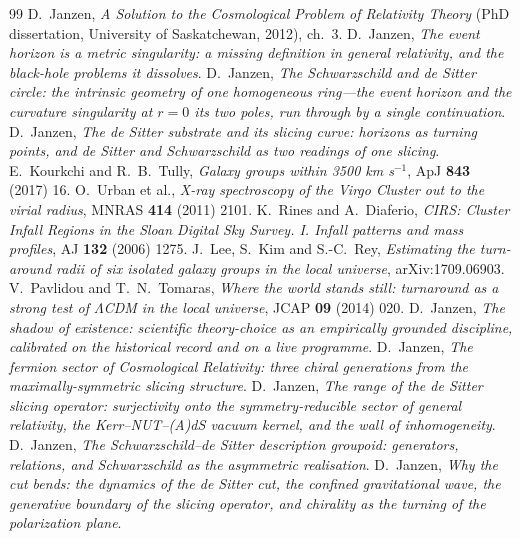 \documentclass[11pt,a4paper]{article}
\theoremstyle{plain}
\theoremstyle{definition}
\begin{document}
\begin{thebibliography}{99}
 D.~Janzen, \emph{A Solution to the Cosmological Problem of Relativity Theory} (PhD dissertation, University of Saskatchewan, 2012), ch.~3.
 D.~Janzen, \emph{The event horizon is a metric singularity: a missing definition in general relativity, and the black-hole problems it dissolves}.
 D.~Janzen, \emph{The Schwarzschild and de Sitter circle: the intrinsic geometry of one homogeneous ring---the event horizon and the curvature singularity at $r=0$ its two poles, run through by a single continuation}.
 D.~Janzen, \emph{The de Sitter substrate and its slicing curve: horizons as turning points, and de Sitter and Schwarzschild as two readings of one slicing}.
 E.~Kourkchi and R.~B.~Tully, \emph{Galaxy groups within 3500 km s$^{-1}$}, ApJ \textbf{843} (2017) 16.
 O.~Urban et al., \emph{X-ray spectroscopy of the Virgo Cluster out to the virial radius}, MNRAS \textbf{414} (2011) 2101.
 K.~Rines and A.~Diaferio, \emph{CIRS: Cluster Infall Regions in the Sloan Digital Sky Survey. I. Infall patterns and mass profiles}, AJ \textbf{132} (2006) 1275.
 J.~Lee, S.~Kim and S.-C.~Rey, \emph{Estimating the turn-around radii of six isolated galaxy groups in the local universe}, arXiv:1709.06903.
 V.~Pavlidou and T.~N.~Tomaras, \emph{Where the world stands still: turnaround as a strong test of $\Lambda$CDM in the local universe}, JCAP \textbf{09} (2014) 020.
 D.~Janzen, \emph{The shadow of existence: scientific theory-choice as an empirically grounded discipline, calibrated on the historical record and on a live programme}.
 D.~Janzen, \emph{The fermion sector of Cosmological Relativity: three chiral generations from the maximally-symmetric slicing structure}.
 D.~Janzen, \emph{The range of the de Sitter slicing operator: surjectivity onto the symmetry-reducible sector of general relativity, the Kerr--NUT--(A)dS vacuum kernel, and the wall of inhomogeneity}.
 D.~Janzen, \emph{The Schwarzschild--de Sitter description groupoid: generators, relations, and Schwarzschild as the asymmetric realisation}.
 D.~Janzen, \emph{Why the cut bends: the dynamics of the de Sitter cut, the confined gravitational wave, the generative boundary of the slicing operator, and chirality as the turning of the polarization plane}.

\end{thebibliography}
\end{document}
